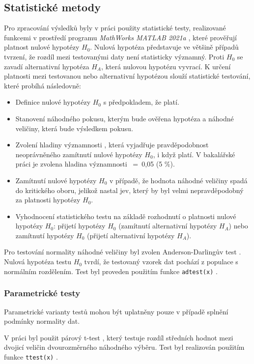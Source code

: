 \subsection{Statistické metody}
\label{section:statistical_methods}
Pro zpracování výsledků byly v práci použity statistické testy, realizované
funkcemi v prostředí programu \textit{MathWorks MATLAB 2021a} \cite{MATLAB},
které prověřují platnost nulové hypotézy $H_0$. Nulová hypotéza představuje ve
většině případů tvrzení, že rozdíl mezi testovanými daty není statisticky
významný. Proti $H_0$ se zavadí alternativní hypotéza $H_A$, která nulovou
hypotézu vyvrací. K určení platnosti mezi testovanou nebo alternativní hypotézou
slouží statistické testování, které probíhá následovně: 
\begin{itemize}
    \item Definice nulové hypotézy $H_0$ s předpokladem, že platí.
    \item Stanovení náhodného pokusu, kterým bude ověřena hypotéza a náhodné
    veličiny, která bude výsledkem pokusu.
    \item Zvolení hladiny významnosti \textalpha, která vyjadřuje
    pravděpodobnost neoprávněného zamítnutí nulové hypotézy $H_0$, i když platí.
    V bakalářské práci je zvolena hladina významnosti \textalpha~=~0,05 (5 \%).
    \item Zamítnutí nulové hypotézy $H_0$ v případě, že hodnota náhodné veličiny
    spadá do kritického oboru, jelikož nastal jev, který by byl velmi
    nepravděpodobný za platnosti hypotézy $H_0$. 
    \item Vyhodnocení statistického testu na základě rozhodnutí o platnosti
    nulové hypotézy $H_0$: přijetí hypotézy $H_0$ (zamítnutí alternativní
    hypotézy $H_A$) nebo zamítnutí hypotézy $H_0$ (přijetí alternativní hypotézy
    $H_A$).
\end{itemize}

Pro testování normality náhodné veličiny byl zvolen Anderson-Darlingův test
\cite{Nelson1998}. Nulová hypotéza testu $H_0$ tvrdí, že testovaný vzorek dat
pochází z populace s normálním rozdělením. Test byl proveden použitím funkce
\texttt{adtest(x)} \cite{matlabADTEST}.

\subsubsection{Parametrické testy}
 Parametrické varianty testů mohou být uplatněny pouze v případě splnění
 podmínky normality dat.

 V práci byl použit párový t-test \cite{Henry2005}, který testuje rozdíl
 středních hodnot mezi dvojicí veličin dvourozměrného náhodného výběru. Test byl
 realizován použitím funkce \texttt{ttest(x)} \cite{matlabTTEST}. 